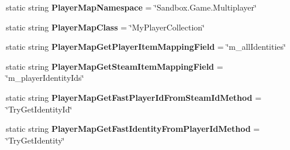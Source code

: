 \begin{DoxyCompactItemize}
\item 
\hypertarget{class_s_e_mod_a_p_i_internal_1_1_a_p_i_1_1_common_1_1_player_map_ae3eccb4a2345851f6f16a64497c3f531}{}static string {\bfseries Player\+Map\+Namespace} = \char`\"{}Sandbox.\+Game.\+Multiplayer\char`\"{}\label{class_s_e_mod_a_p_i_internal_1_1_a_p_i_1_1_common_1_1_player_map_ae3eccb4a2345851f6f16a64497c3f531}

\item 
\hypertarget{class_s_e_mod_a_p_i_internal_1_1_a_p_i_1_1_common_1_1_player_map_a671bf4128e8967886931338ce7768f7c}{}static string {\bfseries Player\+Map\+Class} = \char`\"{}My\+Player\+Collection\char`\"{}\label{class_s_e_mod_a_p_i_internal_1_1_a_p_i_1_1_common_1_1_player_map_a671bf4128e8967886931338ce7768f7c}

\item 
\hypertarget{class_s_e_mod_a_p_i_internal_1_1_a_p_i_1_1_common_1_1_player_map_ad8b28db36c88a13223ff0efe8a5e0b32}{}static string {\bfseries Player\+Map\+Get\+Player\+Item\+Mapping\+Field} = \char`\"{}m\+\_\+all\+Identities\char`\"{}\label{class_s_e_mod_a_p_i_internal_1_1_a_p_i_1_1_common_1_1_player_map_ad8b28db36c88a13223ff0efe8a5e0b32}

\item 
\hypertarget{class_s_e_mod_a_p_i_internal_1_1_a_p_i_1_1_common_1_1_player_map_a91aa4490a8d76cebcb087491014c8bcc}{}static string {\bfseries Player\+Map\+Get\+Steam\+Item\+Mapping\+Field} = \char`\"{}m\+\_\+player\+Identity\+Ids\char`\"{}\label{class_s_e_mod_a_p_i_internal_1_1_a_p_i_1_1_common_1_1_player_map_a91aa4490a8d76cebcb087491014c8bcc}

\item 
\hypertarget{class_s_e_mod_a_p_i_internal_1_1_a_p_i_1_1_common_1_1_player_map_aa40bbc5ca0c657ed517441848c9a92ef}{}static string {\bfseries Player\+Map\+Get\+Fast\+Player\+Id\+From\+Steam\+Id\+Method} = \char`\"{}Try\+Get\+Identity\+Id\char`\"{}\label{class_s_e_mod_a_p_i_internal_1_1_a_p_i_1_1_common_1_1_player_map_aa40bbc5ca0c657ed517441848c9a92ef}

\item 
\hypertarget{class_s_e_mod_a_p_i_internal_1_1_a_p_i_1_1_common_1_1_player_map_a93ef1a5ccad5469a3e783c36abaf9b3d}{}static string {\bfseries Player\+Map\+Get\+Fast\+Identity\+From\+Player\+Id\+Method} = \char`\"{}Try\+Get\+Identity\char`\"{}\label{class_s_e_mod_a_p_i_internal_1_1_a_p_i_1_1_common_1_1_player_map_a93ef1a5ccad5469a3e783c36abaf9b3d}


\end{DoxyCompactItemize}
